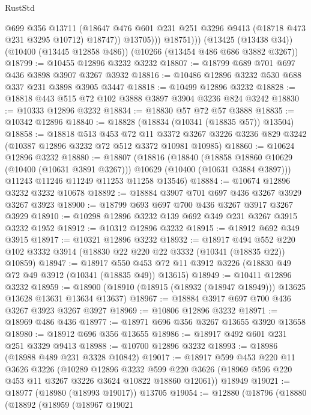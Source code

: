 \begin{lexlean}{RustStd}
\begin{coremodule}
                  @699
                  @356
                  @13711
                  (@18647 @476 @601 @231 @251 @3296 @9413 (@18718 @473 @231 @3295 @10712) @18747))
                @13705)))
          @18751)))
    (@13425 (@13438 @34))
    (@10400 (@13445 @12858 @486))
    (@10266 (@13454 @486 @686 @3882 @3267))
@18799 := @10455 @12896 @3232 @3232
@18807 := @18799 @689 @701 @697 @436 @3898 @3907 @3267 @3932
@18816 := @10486 @12896 @3232 @530 @688 @337 @231 @3898 @3905 @3447
@18818 := @10499 @12896 @3232
@18828 := @18818 @443 @515 @72 @102 @3888 @3897 @3904 @3236 @824 @3242
@18830 := @10333 @12896 @3232
@18834 := @18830 @57 @72 @57 @3888
@18835 := @10342 @12896
@18840 := @18828 (@18834 (@10341 (@18835 @57)) @13504)
@18858 := @18818
    @513
    @453
    @72
    @11
    @3372
    @3267
    @3226
    @3236
    @829
    @3242
    (@10387 @12896 @3232 @72 @512 @3372 @10981 @10985)
@18860 := @10624 @12896 @3232
@18880 := @18807
    (@18816
      (@18840
        (@18858 @18860 @10629 (@10400 (@10631 @3891 @3267)))
        @10629
        (@10400 (@10631 @3884 @3897)))
      @11243
      @11246
      @11249
      @11253
      @11258
      @13546)
@18884 := @10674 @12896 @3232 @3232 @10678
@18892 := @18884 @3907 @701 @697 @436 @3267 @3929 @3267 @3923
@18900 := @18799 @693 @697 @700 @436 @3267 @3917 @3267 @3929
@18910 := @10298 @12896 @3232 @139 @692 @349 @231 @3267 @3915 @3232 @1952
@18912 := @10312 @12896 @3232
@18915 := @18912 @692 @349 @3915
@18917 := @10321 @12896 @3232
@18932 := @18917
    @494
    @552
    @220
    @102
    @3332
    @3914
    (@18830 @22 @220 @22 @3332 (@10341 (@18835 @22)) @10859)
@18947 := @18917
    @550
    @453
    @72
    @11
    @3912
    @3226
    (@18830 @49 @72 @49 @3912 (@10341 (@18835 @49)) @13615)
@18949 := @10411 @12896 @3232
@18959 := @18900 (@18910 (@18915 (@18932 (@18947 @18949))) @13625 @13628 @13631 @13634 @13637)
@18967 := @18884 @3917 @697 @700 @436 @3267 @3923 @3267 @3927
@18969 := @10806 @12896 @3232
@18971 := @18969 @486 @436
@18977 := @18971 @696 @356 @3267 @13655 @3920 @13658
@18980 := @18912 @696 @356 @13655
@18986 := @18917 @492 @601 @231 @251 @3329 @9413
@18988 := @10700 @12896 @3232
@18993 := @18986 (@18988 @489 @231 @3328 @10842)
@19017 := @18917
    @599
    @453
    @220
    @11
    @3626
    @3226
    (@10289
      @12896
      @3232
      @599
      @220
      @3626
      (@18969 @596 @220 @453 @11 @3267 @3226 @3624 @10822 @18860 @12061))
    @18949
@19021 := @18977 (@18980 (@18993 @19017)) @13705
@19054 := @12880
    (@18796
      (@18880
        (@18892
          (@18959
            (@18967
              @19021

\end{coremodule}
\end{lexlean}
